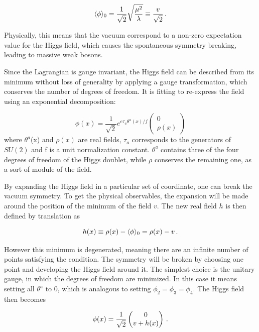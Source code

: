 \begin{equation}
    \langle \phi \rangle_0 = \frac{1}{\sqrt{2}}\sqrt{\frac{\mu^2}{\lambda}} \equiv \frac{v}{\sqrt{2}} \mend
\end{equation}

Physically, this means that the vacuum correspond to a non-zero expectation value for the Higgs field, which causes the spontaneous symmetry breaking, leading to massive weak bosons.

Since the Lagrangian is gauge invariant, the Higgs field can be described from its minimum without loss of generality by applying a gauge transformation, which conserves the number of degrees of freedom. It is fitting to re-express the field using an exponential decomposition:

\begin{equation}
    \phi(x) = \frac{1}{\sqrt{2}}e^{e\tau_a \theta^a (x) / f} \begin{pmatrix} 0 \\ \rho(x) \end{pmatrix}
\end{equation}
where $\theta^a$(x) and $\rho(x)$ are real fields, $\tau_a$ corresponds to the generators of $SU(2)$ and f is a unit normalization constant. $\theta^a$ contains three of the four degrees of freedom of the Higgs doublet, while $\rho$ conserves the remaining one, as a sort of module of the field.\newline

By expanding the Higgs field in a particular set of coordinate, one can break the vacuum symmetry. To get the physical observables, the expansion will be made around the position of the minimum of the field $v$. The new real field $h$ is then defined by translation as

\begin{equation}
    h(x) \equiv \rho (x) - \langle \phi \rangle_0 = \rho(x) - v \mend
\end{equation}

However this minimum is degenerated, meaning there are an infinite number of points satisfying the condition. The symmetry will be broken by choosing one point and developing the Higgs field around it. The simplest choice is the unitary gauge, in which the degrees of freedom are minimized. In this case it means setting all $\theta^a$ to 0, which is analogous to setting $\phi_2 = \phi_3 = \phi_4$. The Higgs field then becomes

\begin{equation}
    \phi(x) = \frac{1}{\sqrt{2}} \begin{pmatrix} 0 \\ v + h(x) \end{pmatrix} \mend
    \label{eq:simphiggsfield}
\end{equation}

